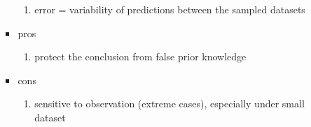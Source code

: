 \begin{itemize}
\begin{itemize}
\begin{itemize}
\begin{enumerate}
 			\item error = variability of predictions between the sampled datasets
 			\end{enumerate}
 		\item pros
 			\begin{enumerate}
 			\item protect the conclusion from false prior knowledge
 			\end{enumerate}
 		\item cons
 			\begin{enumerate}
 			\item sensitive to observation (extreme cases), especially under small dataset
			\end{enumerate}
		\end{itemize}
	\end{itemize}
\end{itemize}
 
